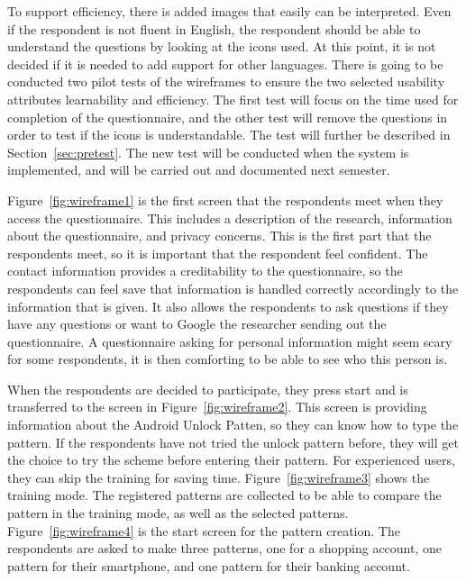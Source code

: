   To support efficiency, there is added images that easily can be interpreted. Even if the respondent is not fluent in English, the respondent should be able to understand the questions by looking at the icons used. At this point, it is not decided if it is needed to add support for other languages. There is going to be conducted two pilot tests of the wireframes to ensure the two selected usability attributes learnability and efficiency. The first test will focus on the time used for completion of the questionnaire, and the other test will remove the questions in order to test if the icons is understandable. The test will further be described in Section~\ref{sec:pretest}. The new test will be conducted when the system is implemented, and will be carried out and documented next semester.




  Figure~\ref{fig:wireframe1} is the first screen that the respondents meet when they access the questionnaire. This includes a description of the research, information about the questionnaire, and privacy concerns. This is the first part that the respondents meet, so it is important that the respondent feel confident. The contact information provides a creditability to the questionnaire, so the respondents can feel save that information is handled correctly accordingly to the information that is given. It also allows the respondents to ask questions if they have any questions or want to Google the researcher sending out the questionnaire. A questionnaire asking for personal information might seem scary for some respondents, it is then comforting to be able to see who this person is.

  When the respondents are decided to participate, they press start and is transferred to the screen in Figure~\ref{fig:wireframe2}. This screen is providing information about the Android Unlock Patten, so they can know how to type the pattern. If the respondents have not tried the unlock pattern before, they will get the choice to try the scheme before entering their pattern. For experienced users, they can skip the training for saving time. Figure~\ref{fig:wireframe3} shows the training mode. The registered patterns are collected to be able to compare the pattern in the training mode, as well as the selected patterns. Figure~\ref{fig:wireframe4} is the start screen for the pattern creation. The respondents are asked to make three patterns, one for a shopping account, one pattern for their smartphone, and one pattern for their banking account.

